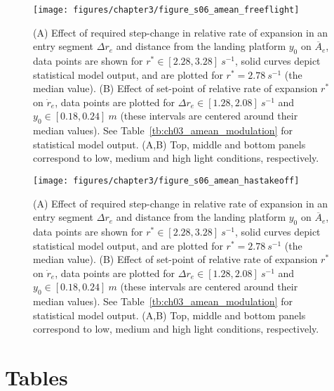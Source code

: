 \begin{figure}[H]
	\centering
	\texttt{[image: figures/chapter3/figure\_s06\_amean\_freeflight]}
	\caption{ (A) Effect of required step-change in relative rate of expansion in an entry segment $\Delta r_e$ and distance from the landing platform $y_0$ on $\overline{A}_e$, data points are shown for $r^* \in [2.28,3.28]~s^{-1}$, solid curves depict statistical model output, and are plotted for $r^*=2.78~s^{-1}$ (the median value). (B) Effect of set-point of relative rate of expansion $r^*$ on $\dot{r}_e$, data points are plotted for $\Delta r_e \in [1.28, 2.08]~s^{-1}$ and $y_0 \in [0.18, 0.24]~m$ (these intervals are centered around their median values). See Table~\ref{tb:ch03_amean_modulation} for statistical model output. (A,B) Top, middle and bottom panels correspond to low, medium and high light conditions, respectively.}
	\label{figure_s06_amean_freeflight}
\end{figure}


\begin{figure}[H]
	\centering
	\texttt{[image: figures/chapter3/figure\_s06\_amean\_hastakeoff]}
	\caption{ (A) Effect of required step-change in relative rate of expansion in an entry segment $\Delta r_e$ and distance from the landing platform $y_0$ on $\overline{A}_e$, data points are shown for $r^* \in [2.28,3.28]~s^{-1}$, solid curves depict statistical model output, and are plotted for $r^*=2.78~s^{-1}$ (the median value). (B) Effect of set-point of relative rate of expansion $r^*$ on $\dot{r}_e$, data points are plotted for $\Delta r_e \in [1.28, 2.08]~s^{-1}$ and $y_0 \in [0.18, 0.24]~m$ (these intervals are centered around their median values). See Table~\ref{tb:ch03_amean_modulation} for statistical model output. (A,B) Top, middle and bottom panels correspond to low, medium and high light conditions, respectively.}
	\label{figure_s06_amean_hastakeoff}
\end{figure}



\newpage
\section{Tables}
\label{sec:s3_tables}

